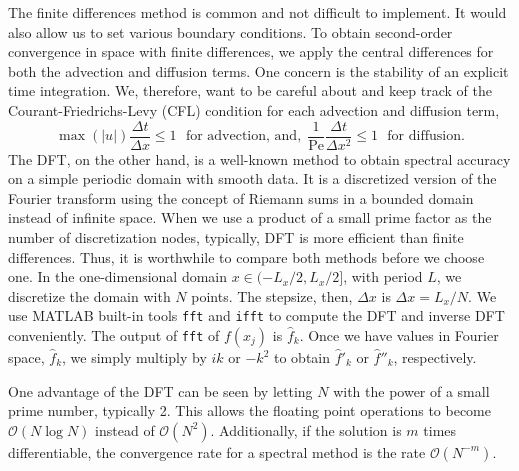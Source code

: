 The finite differences method is common and not difficult to implement. 
It would also allow us to set various boundary conditions. To obtain second-order convergence in space with finite differences, we apply the central differences for both the advection and diffusion terms. 
One concern is the stability of an explicit time integration. We, therefore, want to be careful about and keep track of the Courant-Friedrichs-Levy (CFL) condition for each advection and diffusion term,
\begin{equation}
	\max(|u|) \frac{\Delta t}{\Delta x}  \leq 1 \ \ \ \text{for advection, and,}
	\ \  \frac{1}{\text{Pe}}\frac{\Delta t}{\Delta x^2}  \leq 1 \ \ \ \text{for diffusion}.
\label{eq_CFL}	
\end{equation}
The DFT, on the other hand, is a well-known method to obtain spectral accuracy on a simple periodic domain with smooth data. It is a discretized version of the Fourier transform using the concept of Riemann sums in a bounded domain instead of infinite space. 
When we use a product of a small prime factor as the number of discretization nodes, typically, DFT is more efficient than finite differences. Thus, it is worthwhile to compare both methods before we choose one. 
In the one-dimensional domain $x \in (-L_x/2, L_x/2]$, with period $L$, we discretize the domain with $N$ points. The stepsize, then, $\Delta x$ is $ \Delta x = L_x/N$.
We use MATLAB built-in tools \verb+fft+ and \verb+ifft+ to compute the DFT and inverse DFT conveniently.
The output of \verb+fft+ of $f(x_j)$ is $\hat{f}_k$. Once we have values in Fourier space, $\hat{f}_k$, we simply multiply by $ik$ or $-k^2$ to obtain $\hat{f}'_k$ or $\hat{f}''_k$, respectively. 
\par
One advantage of the DFT can be seen by letting $N$ with the power of a small prime number, typically 2. This allows the floating point operations to become $\mathcal{O}(N \log N)$ instead of $\mathcal{O}(N^2)$. Additionally, if the solution is $m$ times differentiable, the convergence rate for a spectral method is the rate $\mathcal{O}(N^{-m})$. 
